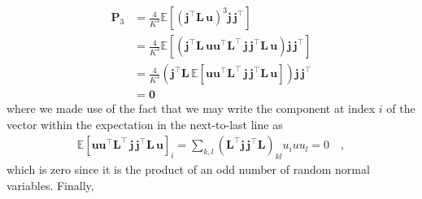 \begin{align}
    \mathbf{P}_3 & = \frac{4}{K^3}\mathbb{E}\left[ \left(\mathbf{j}^\top \mathbf{L} \, \mathbf{u}\right)^3 \mathbf{j} \, \mathbf{j}^\top \right]
    \nonumber                                                                                                                                                                                                                               \\
                 & = \frac{4}{K^3}\mathbb{E}\left[\left(\mathbf{j}^\top \mathbf{L} \,  \mathbf{u} \mathbf{u}^\top  \mathbf{L}^\top \, \mathbf{j} \, \mathbf{j}^\top \mathbf{L} \,  \mathbf{u} \right) \mathbf{j} \, \mathbf{j}^\top \right]
    \nonumber                                                                                                                                                                                                                               \\
                 & = \frac{4}{K^3}\left(\mathbf{j}^\top \mathbf{L} \,  \mathbb{E}\left[\mathbf{u} \mathbf{u}^\top  \mathbf{L}^\top \, \mathbf{j} \, \mathbf{j}^\top \mathbf{L} \,  \mathbf{u}\right] \right) \mathbf{j} \, \mathbf{j}^\top
    \nonumber                                                                                                                                                                                                                               \\
                 & = \mathbf{0}
\end{align}
%
where we made use of the fact that we may write the component at index $i$ of the vector within the expectation in the next-to-last line
as
\begin{align}
    \mathbb{E}\left[\mathbf{u} \mathbf{u}^\top  \mathbf{L}^\top \, \mathbf{j} \, \mathbf{j}^\top \mathbf{L} \,  \mathbf{u}\right]_{i} = \sum\limits_{k,l}(\mathbf{L}^\top \mathbf{j} \, \mathbf{j}^\top \mathbf{L})_{kl} u_i u u_l = 0
    \quad,
    \nonumber
\end{align}
%
which is zero since it is the product of an odd number of random normal variables.
Finally,
%
